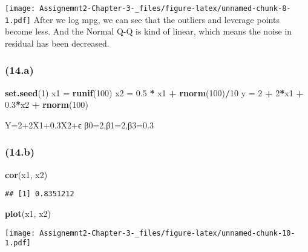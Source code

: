 \documentclass[]{article}
\newenvironment{Shaded}{\begin{snugshade}}{\end{snugshade}}
\newcommand{\DecValTok}[1]{\textcolor[rgb]{0.00,0.00,0.81}{#1}}
\newcommand{\FloatTok}[1]{\textcolor[rgb]{0.00,0.00,0.81}{#1}}
\newcommand{\KeywordTok}[1]{\textcolor[rgb]{0.13,0.29,0.53}{\textbf{#1}}}
\newcommand{\NormalTok}[1]{#1}
\newcommand{\OperatorTok}[1]{\textcolor[rgb]{0.81,0.36,0.00}{\textbf{#1}}}
\newcommand{\StringTok}[1]{\textcolor[rgb]{0.31,0.60,0.02}{#1}}
\begin{document}
\texttt{[image: Assignemnt2-Chapter-3-\_files/figure-latex/unnamed-chunk-8-1.pdf]}
After we log mpg, we can see that the outliers and leverage points
become less. And the Normal Q-Q is kind of linear, which means the noise
in residual has been decreased.

\hypertarget{a-2}{%
\subsubsection{(14.a)}\label{a-2}}

\begin{Shaded}
\begin{Highlighting}[]
\KeywordTok{set.seed}\NormalTok{(}\DecValTok{1}\NormalTok{)}
\NormalTok{x1 =}\StringTok{ }\KeywordTok{runif}\NormalTok{(}\DecValTok{100}\NormalTok{)}
\NormalTok{x2 =}\StringTok{ }\FloatTok{0.5} \OperatorTok{*}\StringTok{ }\NormalTok{x1 }\OperatorTok{+}\StringTok{ }\KeywordTok{rnorm}\NormalTok{(}\DecValTok{100}\NormalTok{)}\OperatorTok{/}\DecValTok{10}
\NormalTok{y =}\StringTok{ }\DecValTok{2} \OperatorTok{+}\StringTok{ }\DecValTok{2}\OperatorTok{*}\NormalTok{x1 }\OperatorTok{+}\StringTok{ }\FloatTok{0.3}\OperatorTok{*}\NormalTok{x2 }\OperatorTok{+}\StringTok{ }\KeywordTok{rnorm}\NormalTok{(}\DecValTok{100}\NormalTok{)}
\end{Highlighting}
\end{Shaded}

Y=2+2X1+0.3X2+ϵ β0=2,β1=2,β3=0.3

\hypertarget{b-2}{%
\subsubsection{(14.b)}\label{b-2}}

\begin{Shaded}
\begin{Highlighting}[]
\KeywordTok{cor}\NormalTok{(x1, x2)}
\end{Highlighting}
\end{Shaded}

\begin{verbatim}
## [1] 0.8351212
\end{verbatim}

\begin{Shaded}
\begin{Highlighting}[]
\KeywordTok{plot}\NormalTok{(x1, x2)}
\end{Highlighting}
\end{Shaded}

\texttt{[image: Assignemnt2-Chapter-3-\_files/figure-latex/unnamed-chunk-10-1.pdf]}
\end{document}
